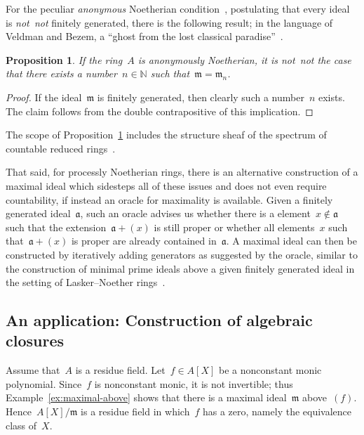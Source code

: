 \documentclass[com,11pt,crcready]{iosart2x}
\theoremstyle{definition}
\theoremstyle{plain}
\newtheorem{proposition}[definition]{Proposition}
\theoremstyle{remark}
\newcommand{\?}{\,{:}\,}
\newcommand{\aaa}{\mathfrak{a}}
\newcommand{\mmm}{\mathfrak{m}}
\newcommand{\NN}{\mathbb{N}}
\renewcommand{\_}{\mathpunct{.}\,}
\begin{document}
For the peculiar \emph{anonymous} Noetherian condition~\cite[Definition~3.27]{blechschmidt:phd}, postulating that every
ideal is \emph{not~not} finitely generated, there is the following result;
in the language of Veldman and Bezem, a ``ghost from the lost classical
paradise''~\cite[Section~5.1]{veldman-bezem:ramsey}.

\begin{proposition}\label{prop:fin-anon}If the ring~$A$ is anonymously
Noetherian, it is \emph{not~not} the case that there exists a number~$n \in
\NN$ such that~$\mmm = \mmm_n$.\end{proposition}

\begin{proof}If the ideal~$\mmm$ is finitely generated, then clearly such a
number~$n$ exists. The claim follows from the double contrapositive of this
implication.
\end{proof}

The scope of Proposition~\ref{prop:fin-anon} includes the structure sheaf of
the spectrum of countable reduced
rings~\cite[Proposition~34]{blechschmidt:generalized-spaces}.

That said, for processly Noetherian rings, there is an alternative
construction of a maximal ideal which sidesteps all of these issues and does
not even require countability, if instead an oracle for maximality is available.
Given a finitely generated ideal~$\aaa$, such an oracle advises us whether there is a
element~$x \not\in \aaa$ such that the extension~$\aaa + (x)$ is still proper
or whether all elements~$x$ such that~$\aaa + (x)$ is proper are already
contained in~$\aaa$. A maximal ideal can then be constructed by iteratively
adding generators as suggested by the oracle, similar to the construction of
minimal prime ideals above a given finitely generated ideal in the setting of
Lasker--Noether rings~\cite[Theorem~E]{perdry:noetherian}.


\subsection{An application: Construction of algebraic closures}

Assume that~$A$ is a residue field. Let~$f \in A[X]$ be a nonconstant monic
polynomial. Since~$f$ is nonconstant monic, it is not invertible; thus
Example~\ref{ex:maximal-above} shows that there is a maximal ideal~$\mmm$
above~$(f)$. Hence~$A[X]/\mmm$ is a residue field in which~$f$ has a zero, namely the equivalence class of~$X$.
\end{document}
